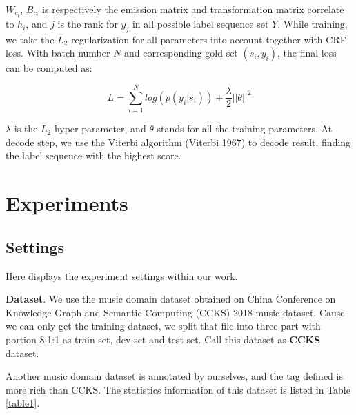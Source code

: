 \documentclass[letterpaper]{article} %
\begin{document}
$W_{c_i}$, $B_{c_i}$ is respectively the emission matrix and transformation matrix correlate to $h_i$, and $j$ is the rank for $y_j$ in all possible label sequence set $Y$.  While training, we take the $L_2$ regularization for all parameters into account together with CRF loss. With batch number $N$ and corresponding gold set $(s_i, y_i)$, the final loss can be computed as:

\begin{equation}
L = \sum_{i=1}^{N}{log(p(y_i | s_i))} + \frac{\lambda}{2}{|| \theta ||}^2
\label{crf_probability}
\end{equation}

$\lambda$ is the $L_2$ hyper parameter, and $\theta$ stands for all the training parameters. At decode step, we use the Viterbi algorithm (Viterbi 1967) to decode result, finding the label sequence with the highest score. 

\section{Experiments}

\subsection{Settings}

Here displays the experiment settings within our work.

\textbf{Dataset}. We use the music domain dataset obtained on China Conference on Knowledge Graph and Semantic Computing (CCKS) 2018 music dataset. Cause we can only get the training dataset,  we split that file into three part with portion 8:1:1 as train set, dev set and test set. Call this dataset as \textbf{CCKS} dataset.

\begin{table}[t]
\caption{Statistics of Music dataset.}\smallskip
\centering
{}
\label{table1}
\end{table}

Another music domain dataset is annotated by ourselves, and the tag defined is more rich than CCKS. The statistics information of this dataset is listed in Table \ref{table1}.
\end{document}
